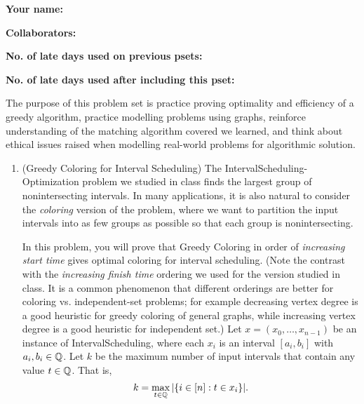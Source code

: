 \documentclass[11pt]{article}
\begin{document}

\textbf{Your name: }

\textbf{Collaborators: }

\textbf{No. of late days used on previous psets: }

\textbf{No. of late days used after including this pset: }

The purpose of this problem set is practice proving optimality and efficiency of a greedy algorithm, practice modelling problems using graphs, reinforce understanding of the matching algorithm covered we learned, and think about ethical issues raised when modelling real-world problems for algorithmic solution.

\begin{enumerate}
    \item (Greedy Coloring for Interval Scheduling) The IntervalScheduling-Optimization problem we studied in class finds the largest group of nonintersecting intervals. 
    In many applications, it is also natural to consider the {\em coloring} version of the problem, where we want to partition the input intervals into as few groups as possible so that each group is nonintersecting.
 
    In this problem, you will prove that Greedy Coloring in order of {\em increasing start time} gives optimal coloring for interval scheduling.  (Note the contrast with the {\em increasing finish time} ordering we used for the version studied in class. It is a common phenomenon that different orderings are better for coloring vs. independent-set problems; for example decreasing vertex degree is a good heuristic for greedy coloring of general graphs, while increasing vertex degree is a good heuristic for independent set.)  Let $x=(x_0,\ldots,x_{n-1})$ be an instance of IntervalScheduling, where each $x_i$ is an interval $[a_i,b_i]$ with $a_i,b_i\in \mathbb{Q}$.  Let $k$ be the maximum number of input intervals that contain any value $t\in \mathbb{Q}$.  That is, $$k = \max_{t\in \mathbb{Q}} |\{ i\in [n]: t\in x_i\}|.$$
 

\end{enumerate}
\end{document}

